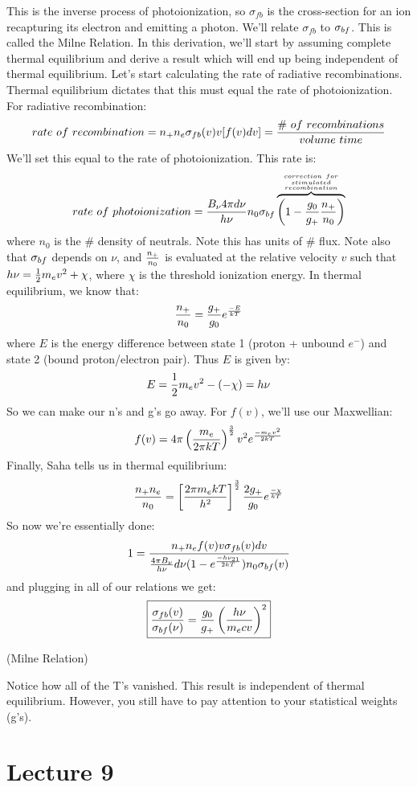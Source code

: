 \documentclass[11pt]{article}
\def\hf{{1 \over 2}}
\begin{document}
\def\sigfb{\sigma_{fb}}
This is the inverse process of photoionization, so $\sigfb$ is the cross-section
for an ion recapturing its electron and emitting a photon.  We'll relate
$\sigfb$ to $\sigma_{bf}$.  This is called the Milne Relation.  In this derivation,
we'll start by assuming complete thermal equilibrium and derive a result which
will end up being independent of thermal equilibrium.  Let's start calculating
the rate of radiative recombinations.  Thermal equilibrium dictates that this
must equal the rate of photoionization.  For radiative recombination:
$$rate\ of\ recombination
=n_+n_e\sigfb(v)v[f(v)dv]={\#\ of\ recombinations\over volume\ time}$$
We'll set this equal to the rate of photoionization. This rate is:
$$rate\ of\ photoionization
={B_\nu4\pi d\nu\over h\nu}n_0\sigbf
\overbrace{\left(1-{g_0\over g_+}{n_+\over n_0}\right)}^{{correction\ for\atop
stimulated}\atop recombination}$$
where $n_0$ is the \# density of neutrals. Note this has units of \# flux.
Note also that $\sigma_{bf}$ depends on $\nu$, and $n_+\over n_0$ is evaluated
at the relative velocity $v$ such that $h\nu=\hf m_ev^2+\chi$, where $\chi$
is the threshold ionization energy.  In thermal equilibrium, we know that:
$${n_+\over n_0}={g_+\over g_0}e^{-E\over kT}$$
where $E$ is the energy difference between state 1 (proton + unbound $e^-$)
and state 2 (bound proton/electron pair).  Thus $E$ is given by:
$$E=\hf m_ev^2-(-\chi)=h\nu$$
So we can make our n's and g's go away.  For $f(v)$, we'll use our Maxwellian:
$$f(v)=4\pi\left({m_e\over 2\pi kT}\right)^{3\over 2}v^2e^{-m_ev^2\over 2kT}$$
Finally, Saha tells us in thermal equilibrium:
$${n_+n_e\over n_0}=\left[{2\pi m_ekT\over h^2}\right]^{3\over 2}{2g_+\over g_0}
e^{-\chi\over kT}$$
So now we're essentially done:
$$1={n_+n_ef(v)v\sigfb(v)dv\over{4\pi B_\nu\over h\nu}d\nu(1-\ehvkt)
n_0\sigbf(v)}$$
and plugging in all of our relations we get:
$$\boxed{{\sigfb(v)\over\sigbf(\nu)}=
{g_0\over g_+}\left({h\nu\over m_ecv}\right)^2}$$
\centerline{(Milne Relation)}
Notice how all of the T's vanished.  
This result is independent of thermal
equilibrium.  However, you still have to pay attention to your statistical
weights (g's).

\section*{ Lecture 9 }
\end{document}
